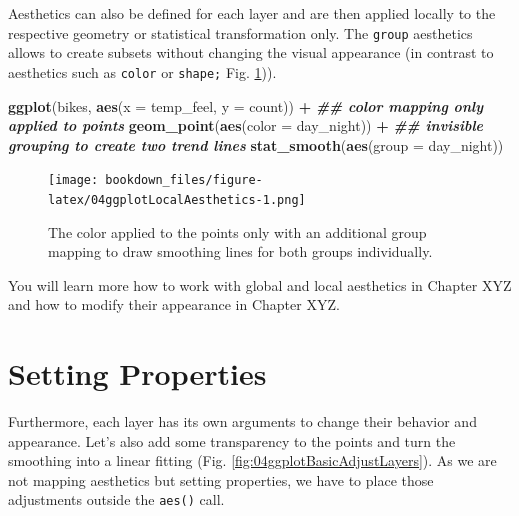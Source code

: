 \documentclass[
]{krantz}
\makeatletter
\newenvironment{Shaded}{\begin{snugshade}}{\end{snugshade}}
\newcommand{\AttributeTok}[1]{\textcolor[rgb]{0.27,0.27,0.27}{#1}}
\newcommand{\DocumentationTok}[1]{\textcolor[rgb]{0.37,0.37,0.37}{\textbf{\textit{#1}}}}
\newcommand{\FunctionTok}[1]{\textcolor[rgb]{0.27,0.27,0.27}{\textbf{#1}}}
\newcommand{\NormalTok}[1]{#1}
\newcommand{\SpecialCharTok}[1]{\textcolor[rgb]{0.43,0.43,0.43}{\textbf{#1}}}
\newenvironment{kframe}{%
\medskip{}
\setlength{\fboxsep}{.8em}
 \def\at@end@of@kframe{}%
 \ifinner\ifhmode%
  \def\at@end@of@kframe{\end{minipage}}%
  \begin{minipage}{\columnwidth}%
 \fi\fi%
 \def\FrameCommand##1{\hskip\@totalleftmargin \hskip-\fboxsep
 \colorbox{shadecolor}{##1}\hskip-\fboxsep
     \hskip-\linewidth \hskip-\@totalleftmargin \hskip\columnwidth}%
 \MakeFramed {\advance\hsize-\width
   \@totalleftmargin\z@ \linewidth\hsize
   \@setminipage}}%
 {\par\unskip\endMakeFramed%
 \at@end@of@kframe}
\renewenvironment{Shaded}{\begin{kframe}}{\end{kframe}}
\makeatother
\begin{document}
Aesthetics can also be defined for each layer and are then applied locally to the respective geometry or statistical transformation only. The \texttt{group} aesthetics allows to create subsets without changing the visual appearance (in contrast to aesthetics such as \texttt{color} or \texttt{shape;} Fig. \ref{fig:04ggplotLocalAesthetics})).

\begin{Shaded}
\begin{Highlighting}[]
\FunctionTok{ggplot}\NormalTok{(bikes, }\FunctionTok{aes}\NormalTok{(}\AttributeTok{x =}\NormalTok{ temp\_feel, }\AttributeTok{y =}\NormalTok{ count)) }\SpecialCharTok{+} 
  \DocumentationTok{\#\# color mapping only applied to points}
  \FunctionTok{geom\_point}\NormalTok{(}\FunctionTok{aes}\NormalTok{(}\AttributeTok{color =}\NormalTok{ day\_night)) }\SpecialCharTok{+} 
  \DocumentationTok{\#\# invisible grouping to create two trend lines}
  \FunctionTok{stat\_smooth}\NormalTok{(}\FunctionTok{aes}\NormalTok{(}\AttributeTok{group =}\NormalTok{ day\_night))}
\end{Highlighting}
\end{Shaded}

\begin{figure}
\centering
\texttt{[image: bookdown\_files/figure-latex/04ggplotLocalAesthetics-1.png]}
\caption{\label{fig:04ggplotLocalAesthetics}The color applied to the points only with an additional group mapping to draw smoothing lines for both groups individually.}
\end{figure}

You will learn more how to work with global and local aesthetics in Chapter XYZ and how to modify their appearance in Chapter XYZ.

\hypertarget{set-properties}{%
\section{Setting Properties}\label{set-properties}}

Furthermore, each layer has its own arguments to change their behavior and appearance. Let's also add some transparency to the points and turn the smoothing into a linear fitting (Fig. \ref{fig:04ggplotBasicAdjustLayers}). As we are not mapping aesthetics but setting properties, we have to place those adjustments outside the \texttt{aes()} call.
\end{document}

